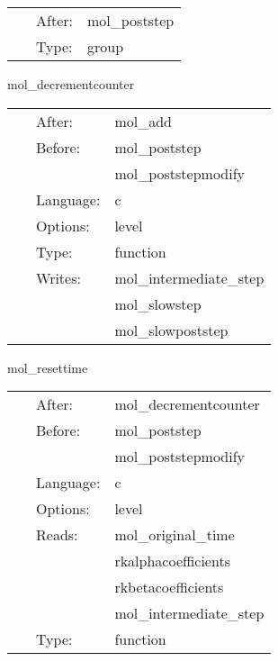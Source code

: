 \hspace{5mm}{\it apply boundary conditions to pseudo-evolved quantities } 


\hspace{5mm}

 \begin{tabular*}{160mm}{cll} 
~ & After:  & mol\_poststep \\ 
~ & Type:  & group \\ 
\end{tabular*} 


\vspace{5mm}


\hspace{5mm} mol\_decrementcounter 

\hspace{5mm}{\it alter the counter number } 


\hspace{5mm}

 \begin{tabular*}{160mm}{cll} 
~ & After:  & mol\_add \\ 
~ & Before:  & mol\_poststep \\ 
~& ~ &mol\_poststepmodify\\ 
~ & Language:  & c \\ 
~ & Options:  & level \\ 
~ & Type:  & function \\ 
~ & Writes:  & mol\_intermediate\_step \\ 
~& ~ &mol\_slowstep\\ 
~& ~ &mol\_slowpoststep\\ 
\end{tabular*} 


\vspace{5mm}


\hspace{5mm} mol\_resettime 

\hspace{5mm}{\it if necessary, change the time } 


\hspace{5mm}

 \begin{tabular*}{160mm}{cll} 
~ & After:  & mol\_decrementcounter \\ 
~ & Before:  & mol\_poststep \\ 
~& ~ &mol\_poststepmodify\\ 
~ & Language:  & c \\ 
~ & Options:  & level \\ 
~ & Reads:  & mol\_original\_time \\ 
~& ~ &rkalphacoefficients\\ 
~& ~ &rkbetacoefficients\\ 
~& ~ &mol\_intermediate\_step\\ 
~ & Type:  & function \\ 
\end{tabular*} 


